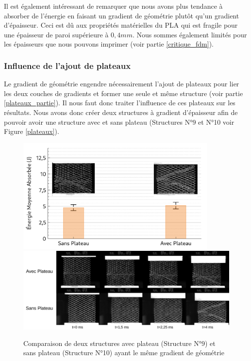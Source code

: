 \documentclass[a4paper]{article}
\begin{document}
	Il est également intéressant de remarquer que nous avons plus tendance à absorber de l'énergie en faisant un gradient de géométrie plutôt qu'un gradient d'épaisseur. Ceci est dû aux propriétés matérielles du PLA qui est fragile pour une épaisseur de paroi supérieure à $0,4 mm$. Nous sommes également limités pour les épaisseurs que nous pouvons imprimer (voir partie \ref{critique_fdm}).
	\newpage
	
	\subsubsection{Influence de l'ajout de plateaux}
	\hspace{0.5cm}Le gradient de géométrie engendre nécessairement l'ajout de plateaux pour lier les deux couches de gradients et former une seule et même structure (voir partie \ref{plateaux_partie}). Il nous faut donc traiter l'influence de ces plateaux sur les résultats. Nous avons donc créer deux structures à gradient d'épaisseur afin de pouvoir avoir une structure avec et sans plateau (Structures N°9 et N°10 voir Figure \ref{plateaux}).
	
	\begin{figure}[H]
		\centering
		\includegraphics[width=10cm]{Images/7/7_4/7_4_3/comp_plateaux.pdf}
		\includegraphics[width=16cm]{Images/7/7_4/7_4_3/instants.pdf}
		\caption{Comparaison de deux structures avec plateau (Structure N°9) et sans plateau (Structure N°10) ayant le même gradient de géométrie}
	\end{figure}
\end{document}
